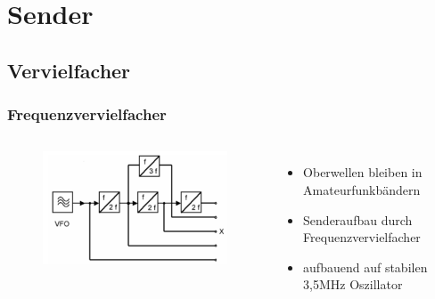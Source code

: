 \section{Sender}

\subsection{Vervielfacher}

\begin{frame}
  \frametitle{Frequenzvervielfacher}

  \begin{columns}
    \begin{center}
      \begin{figure}
        \includegraphics[width=\textwidth,height=.85\textheight,keepaspectratio]{a13/TG103a.png}
      \end{figure}
    \end{center}
    \begin{itemize}
      \item Oberwellen bleiben in Amateurfunkbändern
      \item Senderaufbau durch Frequenzvervielfacher
      \item aufbauend auf stabilen 3,5MHz Oszillator
    \end{itemize}
  \end{columns}
\end{frame}

